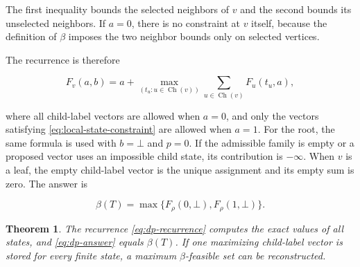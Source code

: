 \documentclass[11pt,a4paper]{article}
\newtheorem{theorem}{Theorem}[section]
\numberwithin{equation}{section}
\begin{document}
The first inequality bounds the selected neighbors of \(v\) and the
second bounds its unselected neighbors. If \(a=0\), there is no
constraint at \(v\) itself, because the definition of \(\beta\) imposes
the two neighbor bounds only on selected vertices.

The recurrence is therefore

\begin{equation}\label{eq:dp-recurrence}
F_v(a,b)
=a+
\max_{(t_u:u\in\operatorname{Ch}(v))}
\sum_{u\in\operatorname{Ch}(v)}F_u(t_u,a),
\end{equation}

where all child-label vectors are allowed when \(a=0\), and only the
vectors satisfying \eqref{eq:local-state-constraint} are allowed when \(a=1\). For the root, the
same formula is used with \(b=\bot\) and \(p=0\). If the admissible
family is empty or a proposed vector uses an impossible child state, its
contribution is \(-\infty\). When \(v\) is a leaf, the empty child-label
vector is the unique assignment and its empty sum is zero. The answer is

\begin{equation}\label{eq:dp-answer}
\beta(T)=\max\{F_\rho(0,\bot),F_\rho(1,\bot)\}.
\end{equation}

\begin{theorem}\label{thm:dp-correctness}
The recurrence \eqref{eq:dp-recurrence} computes the exact values of
all states, and \eqref{eq:dp-answer} equals \(\beta(T)\). If one maximizing child-label
vector is stored for every finite state, a maximum \(\beta\)-feasible
set can be reconstructed.
\end{theorem}
\end{document}
